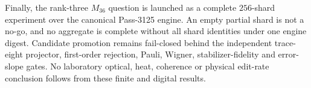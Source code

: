 Finally, the rank-three $M_{36}$ question is launched as a complete $256$-shard experiment over
the canonical Pass-3125 engine.  An empty partial shard is not a no-go, and no aggregate is
complete without all shard identities under one engine digest.  Candidate promotion remains
fail-closed behind the independent trace-eight projector, first-order rejection, Pauli,
Wigner, stabilizer-fidelity and error-slope gates.  No laboratory optical, heat, coherence or
physical edit-rate conclusion follows from these finite and digital results.
